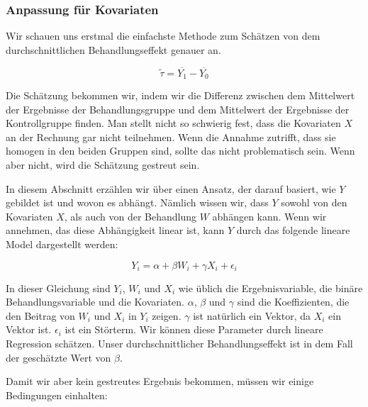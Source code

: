 \documentclass[12pt,a4paper,twoside]{scrartcl}
\numberwithin{equation}{section}
\begin{document}
\subsubsection{Anpassung für Kovariaten}\label{subsubsec:anpassungKovariaten}
Wir schauen uns erstmal die einfachste Methode zum Schätzen von dem durchschnittlichen Behandlungseffekt genauer an.\par

\begin{equation}\label{eq:2.1}
  \widetilde{\tau} = \overline{Y_1}-\overline{Y_0}
\end{equation}

\noindent
Die Schätzung bekommen wir, indem wir die Differenz zwischen dem Mittelwert der Ergebnisse der Behandlungsgruppe und dem Mittelwert der Ergebnisse der Kontrollgruppe finden. Man stellt nicht so schwierig fest, dass die Kovariaten $X$ an der Rechnung gar nicht teilnehmen. Wenn die Annahme zutrifft, dass sie homogen in den beiden Gruppen sind, sollte das nicht problematisch sein. Wenn aber nicht, wird die Schätzung gestreut sein.\par

\noindent
In diesem Abschnitt erzählen wir über einen Ansatz, der darauf basiert, wie $Y$ gebildet ist und wovon es abhängt. Nämlich wissen wir, dass $Y$ sowohl von den Kovariaten $X$, als auch von der Behandlung $W$ abhängen kann. Wenn wir annehmen, das diese Abhängigkeit linear ist, kann $Y$ durch das folgende lineare Model dargestellt werden:\par 

\begin{equation}\label{eq:2.2}
  Y_i = \alpha + \beta W_i + \gamma X_i + \epsilon_i
\end{equation}

\noindent
In dieser Gleichung sind $Y_i$, $W_i$ und $X_i$ wie üblich die Ergebnisvariable, die binäre Behandlungsvariable und die Kovariaten. $\alpha$, $\beta$ und $\gamma$ sind die Koeffizienten, die den Beitrag von $W_i$ und $X_i$ in $Y_i$ zeigen. $\gamma$ ist natürlich ein Vektor, da $X_i$ ein Vektor ist. $\epsilon_i$ ist ein Störterm. Wir können diese Parameter durch lineare Regression schätzen. Unser durchschnittlicher Behandlungseffekt ist in dem Fall der geschätzte Wert von $\beta$\cite{cox1982biometrics}.\par

\noindent
Damit wir aber kein gestreutes Ergebnis bekommen, müssen wir einige Bedingungen einhalten:\par
\end{document}
